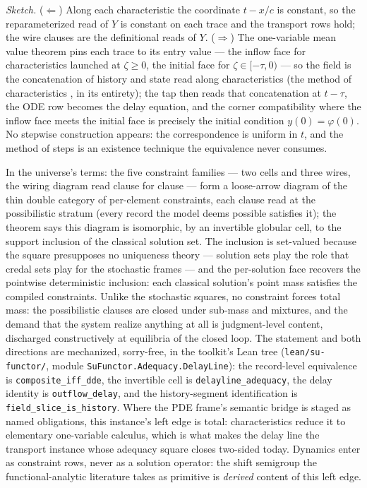 \emph{Sketch.} ($\Leftarrow$) Along each characteristic the coordinate
$t - x/c$ is constant, so the reparameterized read of $Y$
is constant on each trace and the transport rows hold; the wire
clauses are the definitional reads of $Y$.  ($\Rightarrow$) The
one-variable mean value theorem pins each trace to its entry value
--- the inflow face for characteristics launched at $\zeta \ge 0$,
the initial face for $\zeta \in [-\tau, 0)$ --- so the field is the
concatenation of history and state read along characteristics
(the method of characteristics \cite{evans-2010}, in its entirety);
the tap then reads that concatenation at $t - \tau$, the ODE row
becomes the delay equation, and the corner compatibility where the
inflow face meets the initial face is precisely the initial condition
$y(0) = \varphi(0)$.  No stepwise construction appears: the
correspondence is uniform in $t$, and the method of steps is an
existence technique the equivalence never consumes.

In the universe's terms: the five constraint families --- two cells
and three wires, the wiring diagram read clause for clause --- form a
loose-arrow diagram of the thin double category of per-element
constraints, each clause read at the possibilistic stratum (every
record the model deems possible satisfies it); the theorem says this
diagram is isomorphic, by an invertible globular cell, to the
support inclusion of the classical solution set.  The inclusion is
set-valued because the square presupposes no uniqueness theory ---
solution sets play the role that credal sets play for the stochastic
frames --- and the per-solution face recovers the pointwise
deterministic inclusion: each classical solution's point mass
satisfies the compiled constraints.  Unlike the stochastic squares,
no constraint forces total mass: the possibilistic clauses are closed
under sub-mass and mixtures, and the demand that the system realize
anything at all is judgment-level content, discharged constructively
at equilibria of the closed loop.  The statement and both directions
are mechanized, sorry-free, in the toolkit's Lean tree
(\texttt{lean/su-functor/}, module
\texttt{SuFunctor.Adequacy.DelayLine}): the record-level equivalence
is \texttt{composite\_iff\_dde}, the invertible cell is
\texttt{delayline\_adequacy}, the delay identity is
\texttt{outflow\_delay}, and the history-segment identification is
\texttt{field\_slice\_is\_history}.  Where the PDE frame's semantic
bridge is staged as named obligations, this instance's left edge is
total: characteristics reduce it to elementary one-variable calculus,
which is what makes the delay line the transport instance whose
adequacy square closes two-sided today.  Dynamics enter as
constraint rows, never as a solution operator: the shift semigroup
the functional-analytic literature takes as primitive is
\emph{derived} content of this left edge.

